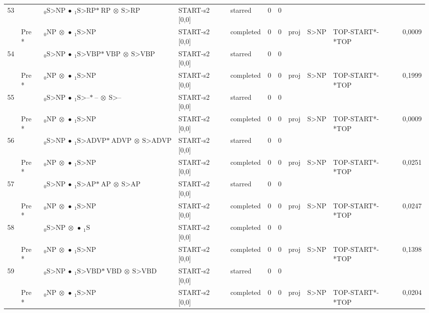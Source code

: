\documentclass[10pt]{article}
\begin{document}
\begin{longtable}[htbp]{lllllllllll}
53 & & $ {}_0 \textrm{S>NP} \  \bullet \ {}_{1} \textrm{S>RP*} \ \textrm{RP} \  \otimes \ \textrm{S>RP} $ & START-s2 [0,0] & starred & 0 & 0 & & & & \\ 
 & Pre *& $ {}_0 \textrm{NP} \  \otimes \  \bullet \ {}_{1} \textrm{S>NP} $ & START-s2 [0,0] & completed & 0 & 0 & proj & S>NP & TOP-START*-*TOP & 0,0009 \\ 
54 & & $ {}_0 \textrm{S>NP} \  \bullet \ {}_{1} \textrm{S>VBP*} \ \textrm{VBP} \  \otimes \ \textrm{S>VBP} $ & START-s2 [0,0] & starred & 0 & 0 & & & & \\ 
 & Pre *& $ {}_0 \textrm{NP} \  \otimes \  \bullet \ {}_{1} \textrm{S>NP} $ & START-s2 [0,0] & completed & 0 & 0 & proj & S>NP & TOP-START*-*TOP & 0,1999 \\ 
55 & & $ {}_0 \textrm{S>NP} \  \bullet \ {}_{1} \textrm{S>--*} \ \textrm{--} \  \otimes \ \textrm{S>--} $ & START-s2 [0,0] & starred & 0 & 0 & & & & \\ 
 & Pre *& $ {}_0 \textrm{NP} \  \otimes \  \bullet \ {}_{1} \textrm{S>NP} $ & START-s2 [0,0] & completed & 0 & 0 & proj & S>NP & TOP-START*-*TOP & 0,0009 \\ 
56 & & $ {}_0 \textrm{S>NP} \  \bullet \ {}_{1} \textrm{S>ADVP*} \ \textrm{ADVP} \  \otimes \ \textrm{S>ADVP} $ & START-s2 [0,0] & starred & 0 & 0 & & & & \\ 
 & Pre *& $ {}_0 \textrm{NP} \  \otimes \  \bullet \ {}_{1} \textrm{S>NP} $ & START-s2 [0,0] & completed & 0 & 0 & proj & S>NP & TOP-START*-*TOP & 0,0251 \\ 
57 & & $ {}_0 \textrm{S>NP} \  \bullet \ {}_{1} \textrm{S>AP*} \ \textrm{AP} \  \otimes \ \textrm{S>AP} $ & START-s2 [0,0] & starred & 0 & 0 & & & & \\ 
 & Pre *& $ {}_0 \textrm{NP} \  \otimes \  \bullet \ {}_{1} \textrm{S>NP} $ & START-s2 [0,0] & completed & 0 & 0 & proj & S>NP & TOP-START*-*TOP & 0,0247 \\ 
58 & & $ {}_0 \textrm{S>NP} \  \otimes \  \bullet \ {}_{1} \textrm{S} $ & START-s2 [0,0] & completed & 0 & 0 & & & & \\ 
 & Pre *& $ {}_0 \textrm{NP} \  \otimes \  \bullet \ {}_{1} \textrm{S>NP} $ & START-s2 [0,0] & completed & 0 & 0 & proj & S>NP & TOP-START*-*TOP & 0,1398 \\ 
59 & & $ {}_0 \textrm{S>NP} \  \bullet \ {}_{1} \textrm{S>VBD*} \ \textrm{VBD} \  \otimes \ \textrm{S>VBD} $ & START-s2 [0,0] & starred & 0 & 0 & & & & \\ 
 & Pre *& $ {}_0 \textrm{NP} \  \otimes \  \bullet \ {}_{1} \textrm{S>NP} $ & START-s2 [0,0] & completed & 0 & 0 & proj & S>NP & TOP-START*-*TOP & 0,0204 \\ 

\end{longtable}
\end{document}
